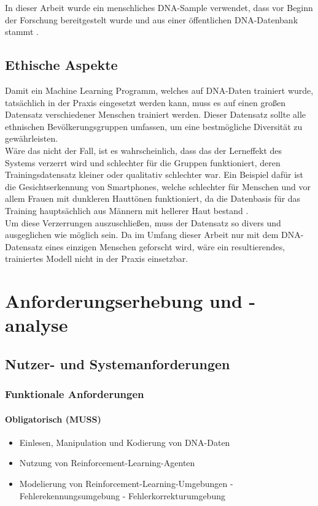 \documentclass[oneside,bibliography=totocnumbered,BCOR=5mm]{scrbook}%
\theoremstyle{definition}
\theoremstyle{definition}
\theoremstyle{definition}
\theoremstyle{definition}
\theoremstyle{definition}
\theoremstyle{definition}
\begin{document}
In dieser Arbeit wurde ein menschliches DNA-Sample verwendet, dass vor Beginn der Forschung bereitgestelt wurde und
aus einer öffentlichen DNA-Datenbank stammt \autocite{humanDNAsample}. \\



\section{Ethische Aspekte}
Damit ein Machine Learning Programm, welches auf DNA-Daten trainiert wurde, tatsächlich in der Praxis
eingesetzt werden kann, muss es auf einen großen Datensatz verschiedener Menschen trainiert werden.
Dieser Datensatz sollte alle ethnischen Bevölkerungsgruppen umfassen, um eine bestmögliche Diversität
zu gewährleisten. \\

Wäre das nicht der Fall, ist es wahrscheinlich, dass das der Lerneffekt des Systems verzerrt wird und
schlechter für die Gruppen funktioniert, deren Trainingsdatensatz kleiner oder qualitativ schlechter war.
Ein Beispiel dafür ist die Gesichtserkennung von Smartphones, welche schlechter für Menschen und 
vor allem Frauen mit dunkleren Hauttönen funktioniert, da die Datenbasis für das Training hauptsächlich
aus Männern mit hellerer Haut bestand \autocite{faceRecognition}. \\

Um diese Verzerrungen auszuschließen, muss der Datensatz so divers und ausgeglichen wie möglich sein.
Da im Umfang dieser Arbeit nur mit dem DNA-Datensatz eines einzigen Menschen geforscht wird, 
wäre ein resultierendes, trainiertes Modell nicht in der Praxis einsetzbar. \\

\clearpage

\chapter{Anforderungserhebung und -analyse}
\section{Nutzer- und Systemanforderungen}
\subsection{Funktionale Anforderungen}
\subsubsection{Obligatorisch (MUSS)}
\begin{itemize}
  \item Einlesen, Manipulation und Kodierung von DNA-Daten
  \item Nutzung von Reinforcement-Learning-Agenten
  \item Modelierung von Reinforcement-Learning-Umgebungen
    \subitem - Fehlerekennungsumgebung
    \subitem - Fehlerkorrekturumgebung
  \end{itemize}
\end{document}
